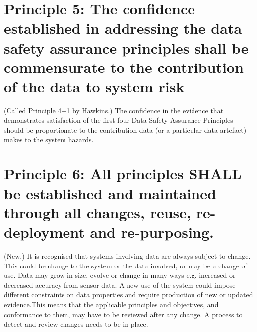 \section{Principle 5: The confidence established in addressing the data safety assurance principles shall be commensurate to the contribution of the data to system risk}
(Called Principle 4+1 by Hawkins.) The confidence in the evidence that demonstrates satisfaction of the first four Data Safety Assurance Principles should be proportionate to the contribution data (or a particular \gls{data artefact}) makes to the system hazards. 
\section{Principle 6: All principles SHALL be established and maintained through all changes, reuse, re-deployment and re-purposing.}
 (New.) It is recognised that systems involving data are always subject to change. This could be change to the system or the data involved, or may be a change of use. Data may grow in size, evolve or change in many ways e.g. increased or decreased accuracy from sensor data.  A new use of the system could impose different constraints on data properties and require production of new or updated evidence.This means that the applicable principles and objectives, and conformance to them, may have to be reviewed after any change. A process to detect and review changes needs to be in place.
